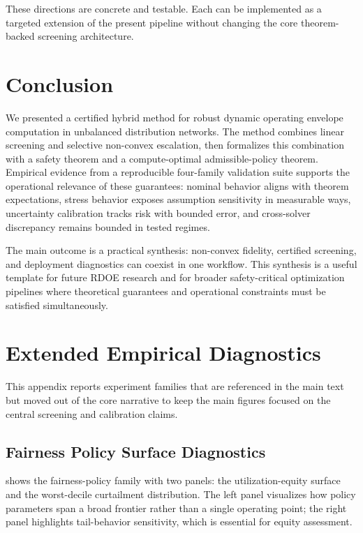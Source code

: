 \documentclass{article} %
\begin{document}
These directions are concrete and testable. Each can be implemented as a targeted extension of the present pipeline without changing the core theorem-backed screening architecture.

\section{Conclusion}
We presented a certified hybrid method for robust dynamic operating envelope computation in unbalanced distribution networks. The method combines linear screening and selective non-convex escalation, then formalizes this combination with a safety theorem and a compute-optimal admissible-policy theorem. Empirical evidence from a reproducible four-family validation suite supports the operational relevance of these guarantees: nominal behavior aligns with theorem expectations, stress behavior exposes assumption sensitivity in measurable ways, uncertainty calibration tracks risk with bounded error, and cross-solver discrepancy remains bounded in tested regimes.

The main outcome is a practical synthesis: non-convex fidelity, certified screening, and deployment diagnostics can coexist in one workflow. This synthesis is a useful template for future RDOE research and for broader safety-critical optimization pipelines where theoretical guarantees and operational constraints must be satisfied simultaneously.






\appendix
\section{Extended Empirical Diagnostics}
\label{sec:appendix_diagnostics}
This appendix reports experiment families that are referenced in the main text but moved out of the core narrative to keep the main figures focused on the central screening and calibration claims.

\subsection{Fairness Policy Surface Diagnostics}
 shows the fairness-policy family with two panels: the utilization-equity surface and the worst-decile curtailment distribution. The left panel visualizes how policy parameters span a broad frontier rather than a single operating point; the right panel highlights tail-behavior sensitivity, which is essential for equity assessment.
\end{document}
